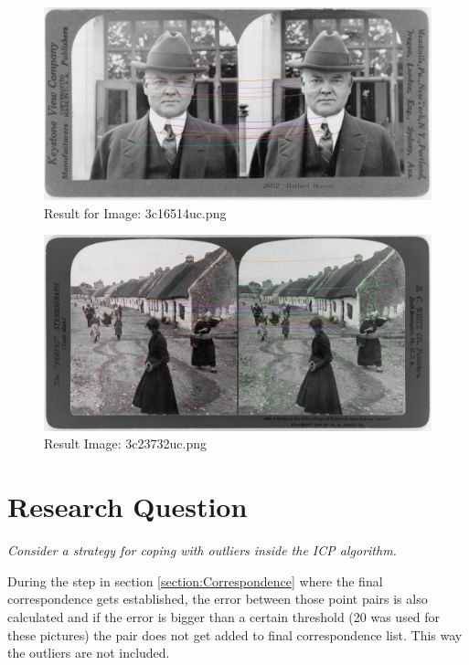\begin{figure}
	\centering
	\includegraphics[width=1\linewidth]{images/ass03result3}
	\caption{Result for Image: 3c16514uc.png}
	\label{fig:Result3_3}
\end{figure}

\begin{figure}
	\centering
	\includegraphics[width=1\linewidth]{images/ass03result4}
	\caption{Result Image: 3c23732uc.png}
	\label{fig:Result3_4}
\end{figure}

\section{Research Question}
\label{section:ResearchQuestion}
\textit{Consider a strategy for coping with outliers inside the ICP algorithm.}

During the step in section \ref{section:Correspondence} where the final correspondence gets established, the error between those point pairs is also calculated and if the error is bigger than a certain threshold (20 was used for these pictures) the pair does not get added to final correspondence list. This way the outliers are not included.







